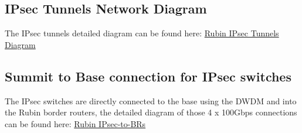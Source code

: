\subsection{IPsec Tunnels Network Diagram}
The IPsec tunnels detailed diagram can be found here: \href{https://confluence.lsstcorp.org/display/IT/ITTN-075+-+Rubin+IPsec+Tunnels+Network+Diagram}{Rubin IPsec Tunnels Diagram}

\subsection{Summit to Base connection for IPsec switches}
The IPsec switches are directly connected to the base using the DWDM and into the Rubin border routers, the detailed diagram of those 4 x 100Gbps connections can be found here: \href{https://confluence.lsstcorp.org/display/IT/ITTN-075+-+Rubin+IPsec-to-BRs}{Rubin IPsec-to-BRs}